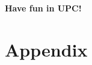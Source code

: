 \documentclass{beamer}
\begin{document}

\begin{frame}
    \begin{center}
        \LARGE\bf Have fun in UPC!
    \end{center}
	
\end{frame}


\section{Appendix}

\end{document}
